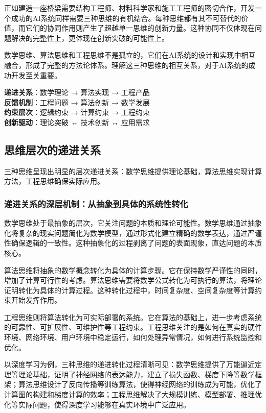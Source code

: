 正如建造一座桥梁需要结构工程师、材料科学家和施工工程师的密切合作，开发一个成功的AI系统同样需要三种思维的有机结合。每种思维都有其不可替代的价值，而它们的协同作用则产生了超越单一思维的创新力量。这种协同不仅体现在问题解决的完整性上，更体现在创新突破的可能性上。

数学思维、算法思维和工程思维不是孤立的，它们在AI系统的设计和实现中相互融合，形成了完整的方法论体系。理解这三种思维的相互关系，对于AI系统的成功开发至关重要。

\begin{tcolorbox}[colback=red!5!white,colframe=red!75!black,title=协同关系：三种思维的融合模式]
\textbf{递进关系}：数学理论 → 算法实现 → 工程产品\\
\textbf{反馈机制}：工程问题 → 算法创新 → 数学发展\\
\textbf{约束层次}：逻辑约束 → 计算约束 → 工程约束\\
\textbf{创新驱动}：理论突破 ↔ 技术创新 ↔ 应用需求
\end{tcolorbox}

\subsection{思维层次的递进关系}

三种思维呈现出明显的层次递进关系：数学思维提供理论基础，算法思维实现计算方法，工程思维确保实际应用。

\subsubsection{递进关系的深层机制：从抽象到具体的系统性转化}

数学思维处于最抽象的层次，它关注问题的本质和理论可能性。数学思维通过抽象化将复杂的现实问题简化为数学模型，通过形式化建立精确的数学表达，通过严谨性确保逻辑的一致性。这种抽象化的过程剥离了问题的表面现象，直达问题的本质核心。

算法思维将抽象的数学概念转化为具体的计算步骤。它在保持数学严谨性的同时，增加了计算可行性的考虑。算法思维需要将数学公式转化为可执行的算法，将理论证明转化为具体的计算过程。这种转化过程中，时间复杂度、空间复杂度等计算约束开始发挥作用。

工程思维则将算法转化为可实际部署的系统。它在算法的基础上，进一步考虑系统的可靠性、可扩展性、可维护性等工程约束。工程思维关注的是如何在真实的硬件环境、网络环境、用户环境中稳定运行，如何处理异常情况，如何进行系统监控和优化。

以深度学习为例，三种思维的递进转化过程清晰可见：数学思维提供了万能逼近定理等理论基础，证明了神经网络的表达能力，建立了损失函数、梯度下降等数学框架；算法思维设计了反向传播等训练算法，使得神经网络的训练成为可能，优化了计算图的构建和梯度计算的效率；工程思维解决了大规模训练、模型部署、推理优化等实际问题，使得深度学习能够在真实环境中广泛应用。

